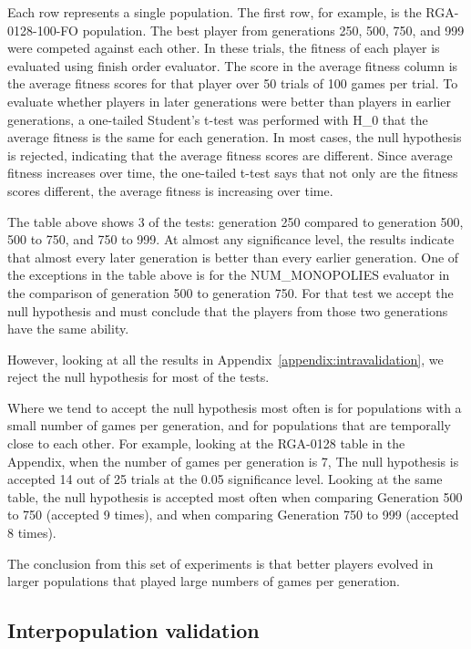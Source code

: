Each row represents a single population. The first row, for example, is the
RGA-0128-100-FO population. The best player from generations 250, 500, 750, and
999 were competed against each other. In these trials, the fitness of each
player is evaluated using finish order evaluator. The score in the average
fitness column is the average fitness scores for that player over 50 trials of
100 games per trial. To evaluate whether players in later generations were
better than players in earlier generations, a one-tailed Student's t-test was
performed with H_{0} that the average fitness is the same for each generation.
In most cases, the null hypothesis is rejected, indicating that the average
fitness scores are different. Since average fitness increases over time, the
one-tailed t-test says that not only are the fitness scores different, the
average fitness is increasing over time.

The table above shows 3 of the tests: generation 250 compared to generation 500,
500 to 750, and 750 to 999. At almost any significance level, the results
indicate that almost every later generation is better than every earlier
generation. One of the exceptions in the table above is for the NUM\_MONOPOLIES
evaluator in the comparison of generation 500 to generation 750. For that test
we accept the null hypothesis and must conclude that the players from those two
generations have the same ability.

However, looking at all the results in Appendix~\ref{appendix:intravalidation},
we reject the null hypothesis for most of the tests.

Where we tend to accept the null hypothesis most often is for populations with
a small number of games per generation, and for populations that are temporally
close to each other. For example, looking at the RGA-0128 table in the Appendix,
when the number of games per generation is 7, The null hypothesis is accepted
14 out of 25 trials at the 0.05 significance level. Looking at the same table,
the null hypothesis is accepted most often when comparing Generation 500 to 750
(accepted 9 times), and when comparing Generation 750 to 999 (accepted 8 times). 

The conclusion from this set of experiments is that better players evolved in
larger populations that played large numbers of games per generation.

\subsection{Interpopulation validation}

